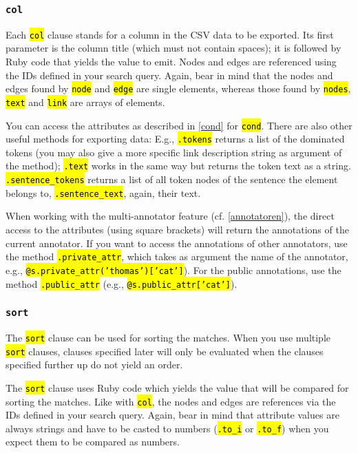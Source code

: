 \documentclass[12pt]{scrartcl}
\newcommand{\code}[1]{\hl{\texttt{#1}}}
\begin{document}
\subsubsection{\texttt{col}}

Each \code{col} clause stands for a column in the CSV data to be exported.
Its first parameter is the column title (which must not contain spaces); it is followed by Ruby code that yields the value to emit.
Nodes and edges are referenced using the IDs defined in your search query.
Again, bear in mind that the nodes and edges found by \code{node} and \code{edge} are single elements, whereas those found by \code{nodes}, \code{text} and \code{link} are arrays of elements.

You can access the attributes as described in \ref{cond} for \code{cond}.
There are also other useful methods for exporting data:
E.g., \code{.tokens} returns a list of the dominated tokens (you may also give a more specific link description string as argument of the method); \code{.text} works in the same way but returns the token text as a string.
\code{.sentence\_tokens} returns a list of all token nodes of the sentence the element belongs to, \code{.sentence\_text}, again, their text.

When working with the multi-annotator feature (cf. \ref{annotatoren}), the direct access to the attributes (using square brackets) will return the annotations of the current annotator.
If you want to access the annotations of other annotators, use the method \mbox{\code{.private\_attr}}, which takes as argument the name of the annotator,\\e.g., \code{@s.private\_attr('thomas')['cat']}).
For the public annotations, use the method \code{.public\_attr} (e.g., \code{@s.public\_attr['cat']}).


\subsubsection{\texttt{sort}}

The \code{sort} clause can be used for sorting the matches.
When you use multiple \code{sort} clauses, clauses specified later will only be evaluated when the clauses specified further up do not yield an order.

The \code{sort} clause uses Ruby code which yields the value that will be compared for sorting the matches.
Like with \code{col}, the nodes and edges are references via the IDs defined in your search query.
Again, bear in mind that attribute values are always strings and have to be casted to numbers (\code{.to\_i} or \code{.to\_f}) when you expect them to be compared as numbers.
\end{document}
